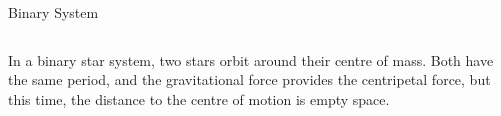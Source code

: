 \documentclass[12pt,compress,aspectratio=169]{beamer}
\begin{document}
\begin{frame}{Binary System}
  \begin{columns}

    In a binary star system, two stars orbit around their centre of mass. Both
    have the same period, and the gravitational force provides the centripetal
    force, but this time, the distance to the centre of motion is empty space.
  \end{columns}
\end{frame}
\end{document}

